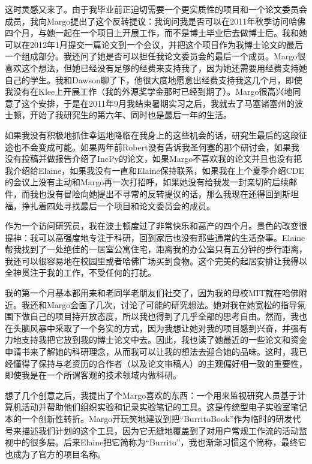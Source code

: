 \documentclass[letter,12pt]{book}
\begin{document}
\begin{CJK}{UTF8}{gbsn}
这时灵感又来了。由于我毕业前正迫切需要一个更实质性的项目和一个论文委员会成员，我向Margo提出了这个反转提议：我询问我是否可以在2011年秋季访问哈佛四个月，与她一起在一个项目上开展工作，而不是博士毕业后去做博士后。我和她可以在2012年1月提交一篇论文到一个会议，并把这个项目作为我博士论文的最后一个组成部分。我还问了她是否可以担任我论文委员会的最后一个成员。Margo很喜欢这个想法，但她已经没有足够的经费来支持我了，因为她还需要用经费支持她自己的学生。我和Dawson聊了下，他很大度地愿意出经费支持我这几个月，即使我没有在Klee上开展工作（我的外源奖学金那时已经到期了）。Margo很高兴地同意了这个安排，于是在2011年9月我结束暑期实习之后，我就去了马塞诸塞州的波士顿，开始了我研究生的第六年、同时也是最后一年的生活。

如果我没有积极地抓住幸运地降临在我身上的这些机会的话，研究生最后的这段征途也不会变成可能。如果两年前Robert没有告诉我圣何塞的那个研讨会，如果我没有投稿并做报告介绍了IncPy的论文，如果Margo不喜欢我的论文并且也没有把我介绍给Elaine，如果我没有一直和Elaine保持联系，如果我在上个夏季介绍CDE的会议上没有主动和Margo再一次打招呼，如果她没有给我发一封亲切的后续邮件，而我也没有冒险向她提出不寻常的反转提议的话，那么我现在还得回到斯坦福，挣扎着四处寻找最后一个项目和论文委员会的成员。

\breakline

作为一个访问研究员，我在波士顿度过了非常快乐和高产的四个月。景色的改变很提神：我可以高强度地专注于科研，回到家后也没有那些通常的生活杂事。Elaine帮我找到了一处绝佳的一居室公寓住宅，距离我的办公室只有五分钟的步行距离，我还可以很容易地在校园里或者哈佛广场买到食物。这个完美的起居安排让我得以全神贯注于我的工作，不受任何的打扰。

我的第一个月基本都用来和老同学老朋友们社交了，因为我的母校MIT就在哈佛附近。我还和Margo会面了几次，讨论了可能的研究想法。她对我在她宽松的指导氛围下做自己的项目持开放态度，所以我也得到了几乎全部的思考自由。然而，我也在头脑风暴中采取了一个务实的方式，因为我想让她对我的项目感到兴奋，并强有力地支持我把它放到我的博士论文中去。因此，我也读了她最近的一些论文和资金申请书来了解她的科研理念，从而我可以让我的想法去迎合她的品味。这时，我已经懂得了保持与老资历的合作者（以及论文审稿人）的主观偏好相一致的重要性，即使我是在一个所谓客观的技术领域内做科研。

想了几个创意之后，我提出了个Margo喜欢的东西：一个用来监视研究人员基于计算机活动并帮助他们组织实验和记录实验笔记的工具。这是传统型电子实验室笔记本的一个创新性转折。Margo开玩笑地建议到把“BurritoBook”作为临时的研发代号来描述我们计划的这个工具，因为它无缝地覆盖到了对用户常规工作流的活动监视中的很多层。后来Elaine把它简称为“Burrito”，我也渐渐习惯这个简称，最终它也成为了官方的项目名称。


\end{CJK}
\end{document}
